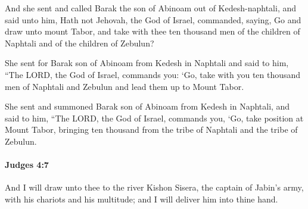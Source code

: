 			\begin{versebox}
					\item[BHS] 
					\item[ASV] And she sent and called Barak the son of Abinoam out of Kedesh-naphtali, and said unto him, Hath not Jehovah, the God of Israel, commanded, saying, Go and draw unto mount Tabor, and take with thee ten thousand men of the children of Naphtali and of the children of Zebulun?
					\item[NIV] She sent for Barak son of Abinoam from Kedesh in Naphtali and said to him, “The LORD, the God of Israel, commands you: ‘Go, take with you ten thousand men of Naphtali and Zebulun and lead them up to Mount Tabor.
					\item[NRSV] She sent and summoned Barak son of Abinoam from Kedesh in Naphtali, and said to him, “The LORD, the God of Israel, commands you, ‘Go, take position at Mount Tabor, bringing ten thousand from the tribe of Naphtali and the tribe of Zebulun.
			\end{versebox}

		\paragraph{Judges 4:7} %
			\label{JUDGES-4-7}

			And I will draw unto thee to the river Kishon Sisera, the captain of Jabin’s army, with his chariots and his multitude; and I will deliver him into thine hand.

